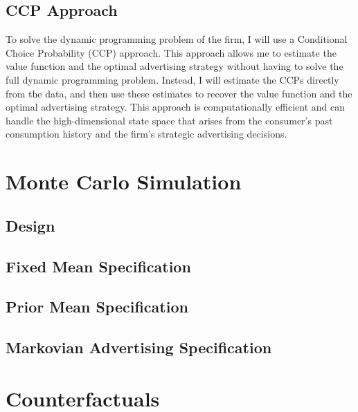 \documentclass[12pt]{article}
\begin{document}
    \subsection{CCP Approach}

      To solve the dynamic programming problem of the firm, I will use a Conditional Choice Probability (CCP) approach. This approach allows me to estimate the value function and the optimal advertising strategy without having to solve the full dynamic programming problem. Instead, I will estimate the CCPs directly from the data, and then use these estimates to recover the value function and the optimal advertising strategy. This approach is computationally efficient and can handle the high-dimensional state space that arises from the consumer's past consumption history and the firm's strategic advertising decisions.

\section{Monte Carlo Simulation}

    \subsection{Design}

    \subsection{Fixed Mean Specification}

    \subsection{Prior Mean Specification}

    \subsection{Markovian Advertising Specification}

\section{Counterfactuals}
\end{document}
